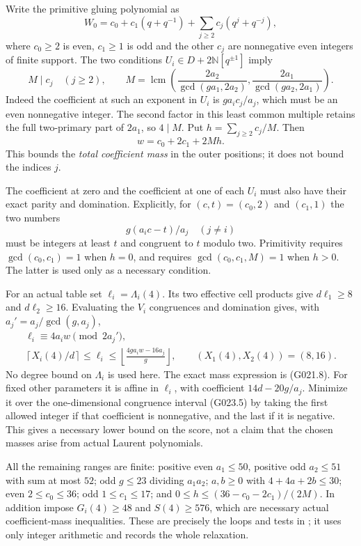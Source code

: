 Write the primitive gluing polynomial as
\[
 W_0=c_0+c_1(q+q^{-1})+
          \sum_{j\ge2}c_j(q^j+q^{-j}),
\]
where $c_0\ge2$ is even, $c_1\ge1$ is odd and the other
$c_j$ are nonnegative even integers of finite support.
The two conditions $U_i\in D+2\mathbb N[q^{\pm1}]$ imply
\[
 M\mid c_j\quad(j\ge2),\qquad
 M=\operatorname{lcm}\left(
 \frac{2a_2}{\gcd(ga_1,2a_2)},
 \frac{2a_1}{\gcd(ga_2,2a_1)}\right).
 \tag{G023.2}
\]
Indeed the coefficient at such an exponent in $U_i$ is
$ga_ic_j/a_j$, which must be an even nonnegative integer.
The second factor in this least common multiple retains
the full two-primary part of $2a_1$, so $4\mid M$.
Put $h=\sum_{j\ge2}c_j/M$. Then
\[
 w=c_0+2c_1+2Mh.                                     \tag{G023.3}
\]
This bounds the \emph{total coefficient mass} in the outer
positions; it does not bound the indices $j$.

The coefficient at zero and the coefficient at one of each
$U_i$ must also have their exact parity and domination.
Explicitly, for $(c,t)=(c_0,2)$ and $(c_1,1)$ the two numbers
\[
 g(a_ic-t)/a_j\quad(j\ne i)
 \tag{G023.4}
\]
must be integers at least $t$ and congruent to $t$ modulo two.
Primitivity requires $\gcd(c_0,c_1)=1$ when $h=0$, and
requires $\gcd(c_0,c_1,M)=1$ when $h>0$. The latter is
used only as a necessary condition.

For an actual table set $\ell_i=\Lambda_i(4)$. Its two
effective cell products give $d\ell_1\ge8$ and
$d\ell_2\ge16$. Evaluating the $V_i$ congruences and
domination gives, with $a_j'=a_j/\gcd(g,a_j)$,
\[
 \begin{gathered}
 \ell_i\equiv4a_iw\pmod{2a_j'},\\
 \left\lceil X_i(4)/d\right\rceil\le\ell_i\le
 \left\lfloor\frac{4ga_iw-16a_j}{g}\right\rfloor,
 \qquad (X_1(4),X_2(4))=(8,16).
 \end{gathered}                                       \tag{G023.5}
\]
No degree bound on $\Lambda_i$ is used here.
The exact mass expression is (G021.8). For fixed other
parameters it is affine in $\ell_i$, with coefficient
$14d-20g/a_j$. Minimize it over the one-dimensional
congruence interval (G023.5) by taking the first allowed
integer if that coefficient is nonnegative, and the last
if it is negative. This gives a necessary lower bound on
the score, not a claim that the chosen masses arise from
actual Laurent polynomials.

All the remaining ranges are finite: positive even
$a_1\le50$, positive odd $a_2\le51$ with sum at most $52$;
odd $g\le23$ dividing $a_1a_2$; $a,b\ge0$ with
$4+4a+2b\le30$; even $2\le c_0\le36$; odd
$1\le c_1\le17$; and $0\le h\le(36-c_0-2c_1)/(2M)$.
In addition impose $G_i(4)\ge48$ and $S(4)\ge576$,
which are necessary actual coefficient-mass inequalities.
These are precisely the loops and tests in
; it uses only integer
arithmetic and records the whole relaxation.

